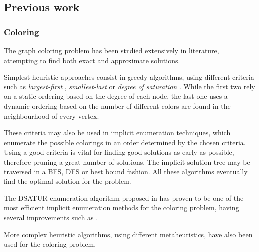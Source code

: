\subsection{Previous work}
\label{subsec:previouswork}

\subsubsection*{Coloring}

The graph coloring problem has been studied extensively in literature, attempting to find both exact and approximate solutions.

Simplest heuristic approaches consist in greedy algorithms, using different criteria such as \textit{largest-first} \cite{welsh1967upper}, \textit{smallest-last} \cite{matula1972graph} or \textit{degree of saturation} \cite{brelaz1979new}. While the first two rely on a static ordering based on the degree of each node, the last one uses a dynamic ordering based on the number of different colors are found in the neighbourhood of every vertex.

These criteria may also be used in implicit enumeration techniques, which enumerate the possible colorings in an order determined by the chosen criteria. Using a good criteria is vital for finding good solutions as early as possible, therefore pruning a great number of solutions. The implicit solution tree may be traversed in a BFS, DFS or best bound fashion. All these algorithms eventually find the optimal solution for the problem.

The DSATUR enumeration algorithm proposed in \cite{brelaz1979new} has proven to be one of the most efficient implicit enumeration methods for the coloring problem, having several improvements such as \cite{sewell1996improved}.

More complex heuristic algorithms, using different metaheuristics, have also been used for the coloring problem.

